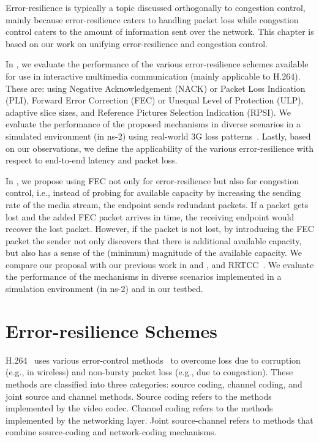 Error-resilience is typically a topic discussed orthogonally to congestion
control, mainly because error-resilience caters to handling
packet loss while congestion control caters to the amount of information sent
over the network. This chapter is based on our work on unifying
error-resilience and congestion control.

In , we evaluate the performance of the various
error-resilience schemes available for use in interactive multimedia
communication (mainly applicable to H.264). These are: using Negative
Acknowledgement (NACK) or Packet Loss Indication (PLI), Forward Error
Correction (FEC) or Unequal Level of Protection (ULP), adaptive slice sizes,
and Reference Pictures Selection Indication (RPSI). We evaluate the
performance of the proposed mechanisms in diverse scenarios in a simulated
environment (in ns-2) using real-world 3G loss patterns~\cite{3gppSim}.
Lastly, based on our observations, we define the applicability of the various
error-resilience with respect to end-to-end latency and packet loss.

In , we propose using FEC not only for error-resilience but
also for congestion control, i.e., instead of probing for available capacity
by increasing the sending rate of the media stream, the endpoint sends
redundant packets. If a packet gets lost and the added FEC packet arrives in
time, the receiving endpoint would recover the lost packet. However, if the
packet is not lost, by introducing the FEC packet the sender not only
discovers that there is additional available capacity, but also has a sense of
the (minimum) magnitude of the available capacity. We compare our proposal
with our previous work in  and , and 
RRTCC~\cite{draft.rrtcc}. We evaluate the performance of the
mechanisms in diverse scenarios implemented in a simulation environment (in
ns-2) and in our testbed.

\section{Error-resilience Schemes}

H.264~\cite{h264} uses various error-control methods~\cite{err_res_h264_std,
wang98error, wang00review, 310669} to overcome loss due to corruption (e.g.,
in wireless) and non-bursty packet loss (e.g., due to congestion). These
methods are classified into three categories: source coding, channel coding,
and joint source and channel methods. Source coding refers to the methods
implemented by the video codec. Channel coding refers to the methods
implemented by the networking layer. Joint source-channel refers to methods
that combine source-coding and network-coding mechanisms.

